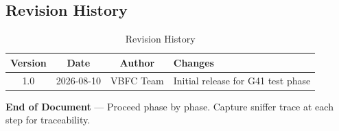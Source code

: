 \subsection*{Revision History}

\begin{table}[h]
\centering
\caption{Revision History}
\label{tab:revision}
\begin{tabular}{@{}cccl@{}}
\toprule
\textbf{Version} & \textbf{Date} & \textbf{Author} & \textbf{Changes} \\
\midrule
1.0 & 2026-08-10 & VBFC Team & Initial release for G41 test phase \\
\bottomrule
\end{tabular}
\end{table}

\noindent\textbf{End of Document} — Proceed phase by phase. Capture sniffer trace at each step for traceability.